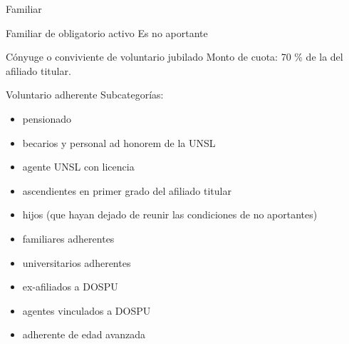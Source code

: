 \documentclass[10pt]{beamer}
\begin{document}
\begin{frame}{Familiar}
    \begin{block}{Familiar de obligatorio activo}
        Es no aportante
    \end{block}
    \begin{block}{Cónyuge o conviviente de voluntario jubilado}
        Monto de cuota:  70 \% de la del afiliado titular.
    \end{block}
\end{frame}
\begin{comment}
Como se mencionó antes, los afiliados de esta categoría son familiares de afiliados titulares, distinguiéndose entre
- Familiar de obligatorio activo: son no aportantes, es decir que su cuota es 0.
- Cónyuge o conviviente de voluntario jubilado: su cuota es (fórmula en la slide).
\end{comment}

\begin{frame}{Voluntario adherente}
    Subcategorías:
    \begin{itemize}
        \item pensionado
        \item becarios y personal ad honorem de la UNSL
        \item agente UNSL con licencia
        \item ascendientes en primer grado del afiliado titular
        \item hijos (que hayan dejado de reunir las condiciones de no aportantes)
        \item familiares adherentes
        \item universitarios adherentes
        \item ex-afiliados a DOSPU
        \item agentes vinculados a DOSPU
        \item adherente de edad avanzada
    \end{itemize}
\end{frame}
\begin{comment}
Como su nombre lo indica son aquellos que optan voluntariamente por ser afiliados de la obra social, pagando aportes dependientes de la subcategoría a la que pertenezcan.
Dentro de esta se esta categoría, se encuentran las siguientes subcategorías:
- pensionado
- becarios y personal ad honorem de la UNSL
- agente UNSL con licencia
- ascendientes en primer grado del afiliado titular
- hijos que hayan dejado de reunir las condiciones de no aportantes
- familiares adherentes
- universitarios adherentes
- ex-afiliados a DOSPU
- agentes vinculados a DOSPU
- adherente de edad avanzada
\end{comment}
\end{document}
